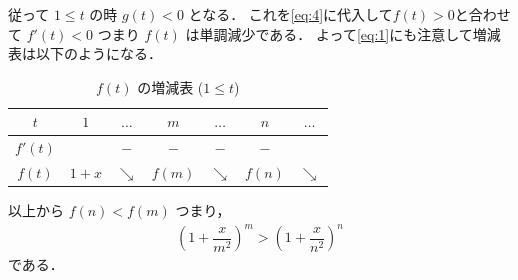 \documentclass[../../main.tex]{subfiles}
\begin{document}
従って $1\le t$ の時 $g(t)<0$ となる．
これを\cref{eq:4}に代入して$f(t)>0$と合わせて $f'(t)<0$ つまり $f(t)$ は単調減少である．
よって\cref{eq:1}にも注意して増減表は以下のようになる．

\begin{table}[htb]
  \centering
  \caption{$f(t)$ の増減表 ($1 \le t$)}
  \begin{tabular}{c|cccccc}
    $t$ & $1$ & $\dots$ & $m$ & $\dots$ & $n$ & $\dots$ \\ \hline
    $f'(t)$ & & $-$ & $-$ & $-$ & $-$ & \\ \hline
    $f(t)$ & $1+x$ & $\searrow$ & $f(m)$ & $\searrow$ & $f(n)$ & $\searrow$
  \end{tabular}
\end{table}

以上から $f(n)<f(m)$ つまり，
\begin{align}
  \left(1+\dfrac{x}{m^2}\right)^m>\left(1+\dfrac{x}{n^2}\right)^n
\end{align}
である．

\newpage
\end{document}
